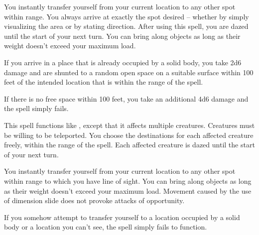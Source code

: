 \spellrng{\rngext}
\begin{spelleffect}
  You instantly transfer yourself from your current location to any other spot within range. You always arrive at exactly the spot desired -- whether by simply visualizing the area or by stating direction. After using this spell, you are dazed until the start of your next turn. You can bring along objects as long as their weight doesn't exceed your maximum load.
\end{spelleffect}
\begin{spellnotes}
  \par If you arrive in a place that is already occupied by a solid body, you take 2d6 damage and are shunted to a random open space on a suitable surface within 100 feet of the intended location that is within the range of the spell.
  \par  If there is no free space within 100 feet, you take an additional 4d6 damage and the spell simply fails.
\end{spellnotes}

\begin{spelleffect}
  This spell functions like , except that it affects multiple creatures. Creatures must be willing to be teleported. You choose the destinations for each affected creature freely, within the range of the spell. Each affected creature is dazed until the start of your next turn.
\end{spelleffect}

\spellrng{\rngclose}
\begin{spelleffect}
  You instantly transfer yourself from your current location to any other spot within range to which you have line of sight. You can bring along objects as long as their weight doesn't exceed your maximum load. Movement caused by the use of dimension slide does not provoke attacks of opportunity.
  \par If you somehow attempt to transfer yourself to a location occupied by a solid body or a location you can't see, the spell simply fails to function.
\end{spelleffect}

